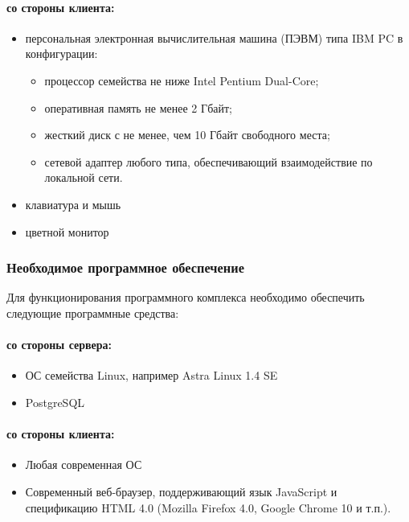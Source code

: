 \paragraph*{со стороны клиента:} \hfill

\begin{itemize}
\item персональная электронная вычислительная машина (ПЭВМ) типа IBM PC в
конфигурации:

\begin{itemize}
\item процессор семейства не ниже Intel Pentium Dual-Core;
\item оперативная память не менее 2 Гбайт;
\item жесткий диск с не менее, чем 10 Гбайт свободного места;
\item сетевой адаптер любого типа, обеспечивающий взаимодействие по локальной сети.
\end{itemize}
\item клавиатура и мышь
\item цветной монитор
\end{itemize}


\subsubsection{Необходимое программное обеспечение}

Для функционирования программного комплекса необходимо обеспечить следующие программные средства: 

\paragraph*{со стороны сервера:} \hfill

\begin{itemize}
\item ОС семейства Linux, например Astra Linux 1.4 SE
\item PostgreSQL
\end{itemize}

\paragraph*{со стороны клиента:} \hfill

\begin{itemize}
\item Любая современная ОС
\item Современный веб-браузер, поддерживающий язык JavaScript и спецификацию HTML 4.0 (Mozilla Firefox 4.0, Google Chrome 10 и т.п.).
\end{itemize}

